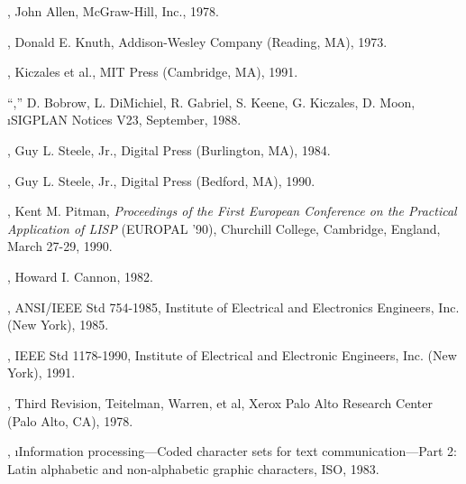 
\beginlist

\item{\bull} {\AnatomyOfLisp},
        John Allen, McGraw-Hill, Inc., 1978.

\item{\bull} {\KnuthVolThree},
             Donald E. Knuth, Addison-Wesley Company (Reading, MA), 1973.

\item{\bull} {\MetaObjectProtocol},
	Kiczales et al., MIT Press (Cambridge, MA), 1991.

\item{\bull} ``\CLOSPaper,''
        D. Bobrow, L. DiMichiel, R. Gabriel, S. Keene, G. Kiczales, D. Moon,
        \i{SIGPLAN Notices} V23, September, 1988.

\item{\bull} {\CLtL},
        Guy L. Steele, Jr., Digital Press (Burlington, MA), 1984.

\item{\bull} {\CLtLTwo},
        Guy L. Steele, Jr., Digital Press (Bedford, MA), 1990.

\item{\bull} {\CondSysPaper},
	Kent M. Pitman,
	{\it Proceedings of the First European Conference
	     on the Practical Application of LISP\/}
        (EUROPAL '90),
	Churchill College, Cambridge, England,
	March 27-29, 1990.

\item{\bull} {\FlavorsPaper},
	Howard I. Cannon, 1982.

\item{\bull} {\IEEEFloatingPoint},
        ANSI/IEEE Std 754-1985,
        Institute of Electrical and Electronics Engineers, Inc. (New York), 1985.

\item{\bull} {\IEEEScheme},
	IEEE Std 1178-1990,
	Institute of Electrical and Electronic Engineers, Inc. (New York), 1991.

\item{\bull} {\InterlispManual}, Third Revision,
	Teitelman, Warren, et al,
	Xerox Palo Alto Research Center (Palo Alto, CA), 1978.

\item{\bull} \ISOChars,
	\i{Information processing---Coded character sets 
           for text communication---Part 2: Latin alphabetic and non-alphabetic
           graphic characters}, 
	ISO, 1983.

